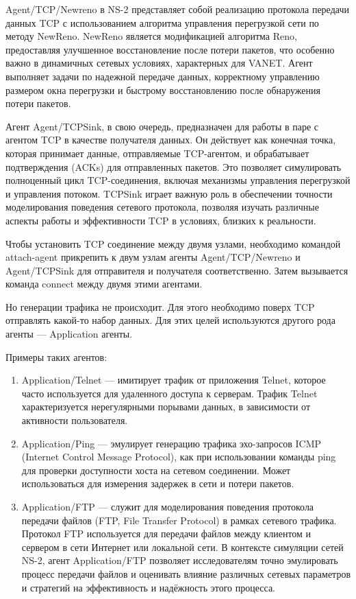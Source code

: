 Agent/TCP/Newreno в NS-2 представляет собой реализацию протокола передачи данных TCP с использованием алгоритма управления перегрузкой сети по методу NewReno. NewReno является модификацией алгоритма Reno, предоставляя улучшенное восстановление после потери пакетов, что особенно важно в динамичных сетевых условиях, характерных для VANET. Агент выполняет задачи по надежной передаче данных, корректному управлению размером окна перегрузки и быстрому восстановлению после обнаружения потери пакетов.

Агент Agent/TCPSink, в свою очередь, предназначен для работы в паре с агентом TCP в качестве получателя данных. Он действует как конечная точка, которая принимает данные, отправляемые TCP-агентом, и обрабатывает подтверждения (ACKs) для отправленных пакетов. Это позволяет симулировать полноценный цикл TCP-соединения, включая механизмы управления перегрузкой и управления потоком. TCPSink играет важную роль в обеспечении точности моделирования поведения сетевого протокола, позволяя изучать различные аспекты работы и эффективности TCP в условиях, близких к реальности.

Чтобы установить TCP соединение между двумя узлами, необходимо командой attach-agent прикрепить к двум узлам агенты Agent/TCP/Newreno и Agent/TCPSink для отправителя и получателя соответственно. Затем вызывается команда connect между двумя этими агентами.

Но генерации трафика не происходит. Для этого необходимо поверх TCP отправлять какой-то набор данных. Для этих целей используются другого рода агенты --- Application агенты.

Примеры таких агентов:

\begin{enumerate}
  \item Application/Telnet --- имитирует трафик от приложения Telnet, которое часто используется для удаленного доступа к серверам. Трафик Telnet характеризуется нерегулярными порывами данных, в зависимости от активности пользователя.
  \item Application/Ping --- эмулирует генерацию трафика эхо-запросов ICMP (Internet Control Message Protocol), как при использовании команды ping для проверки доступности хоста на сетевом соединении. Может использоваться для измерения задержек в сети и потери пакетов.
  \item Application/FTP --- служит для моделирования поведения протокола передачи файлов (FTP, File Transfer Protocol) в рамках сетевого трафика. Протокол FTP используется для передачи файлов между клиентом и сервером в сети Интернет или локальной сети. В контексте симуляции сетей NS-2, агент Application/FTP позволяет исследователям точно эмулировать процесс передачи файлов и оценивать влияние различных сетевых параметров и стратегий на эффективность и надёжность этого процесса.
\end{enumerate}

